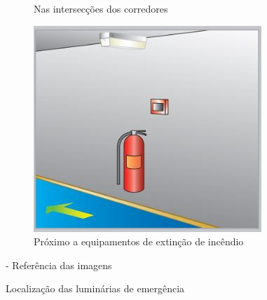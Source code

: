 \begin{figure}[H]
\begin{subfigure}[b]{0.3\textwidth}
			\caption{Nas intersecções dos corredores}
			\label{fig: style 1 image h}
		\end{subfigure}
		\hfill
		\begin{subfigure}[b]{0.3\textwidth}
			\centering
			\includegraphics[width=\textwidth]{Figures/3. Lighting/light-safety9.jpg}
			\caption{Próximo a equipamentos de extinção de incêndio}
			\label{fig: style 1 image y}
		\end{subfigure}
		\caption{Localização das luminárias de emergência} - Referência das imagens \cite{eaton2013} 
		\label{fig: safety-luminarires-places}
	\end{figure}
